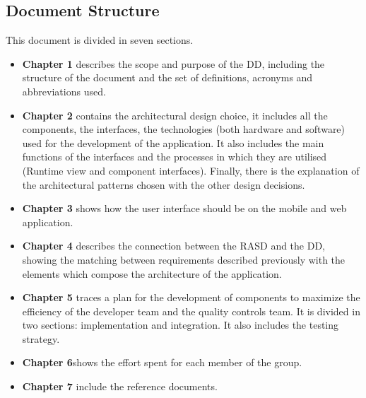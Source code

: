 \subsection{Document Structure}
This document is divided in seven sections.
\begin{itemize}
    \item \textbf{Chapter 1} describes the scope and purpose of the DD, including the structure of the document and the set of definitions, acronyms and abbreviations used.
    
    \item \textbf{Chapter 2} contains the architectural design choice, it includes all the components, the interfaces, the technologies (both hardware and software) used for the development of the application. It also includes the main functions of the interfaces and the processes in which they are utilised (Runtime view and component interfaces). Finally, there is the explanation of the architectural patterns chosen with the other design decisions.
    
    \item \textbf{Chapter 3} shows how the user interface should be on the mobile and web application.
    
    \item \textbf{Chapter 4} describes the connection between the RASD and the DD, showing the matching between requirements described previously with the elements which compose the architecture of the application.
    
    \item \textbf{Chapter 5} traces a plan for the development of components to maximize the efficiency of the developer team and the quality controls team. It is divided in two sections: implementation and integration. It also includes the testing strategy.
    
    \item \textbf{Chapter 6}shows the effort spent for each member of the group.
    
    \item \textbf{Chapter 7} include the reference documents.
 \end{itemize}

\vfill